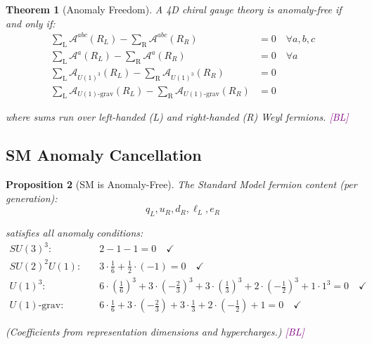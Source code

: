 \documentclass[11pt,a4paper]{article}
\newtheorem{theorem}{Theorem}[section]
\newtheorem{proposition}[theorem]{Proposition}
\newcommand{\tagBL}{\textcolor{purple}{[BL]}}
\begin{document}
\begin{theorem}[Anomaly Freedom]
\label{thm:anomaly-free}
A 4D chiral gauge theory is anomaly-free if and only if:
\begin{align}
\label{eq:anomaly-cond-1}
\sum_{\text{L}} \mathcal{A}^{abc}(R_L) - \sum_{\text{R}} \mathcal{A}^{abc}(R_R) &= 0 \quad \forall a, b, c \\
\label{eq:anomaly-cond-2}
\sum_{\text{L}} \mathcal{A}^a(R_L) - \sum_{\text{R}} \mathcal{A}^a(R_R) &= 0 \quad \forall a \\
\label{eq:anomaly-cond-3}
\sum_{\text{L}} \mathcal{A}_{U(1)^3}(R_L) - \sum_{\text{R}} \mathcal{A}_{U(1)^3}(R_R) &= 0 \\
\label{eq:anomaly-cond-4}
\sum_{\text{L}} \mathcal{A}_{U(1)\text{-grav}}(R_L) - \sum_{\text{R}} \mathcal{A}_{U(1)\text{-grav}}(R_R) &= 0
\end{align}

where sums run over left-handed (L) and right-handed (R) Weyl fermions.
\tagBL
\end{theorem}

\subsection{SM Anomaly Cancellation}

\begin{proposition}[SM is Anomaly-Free]
\label{prop:sm-anomaly}
The Standard Model fermion content (per generation):
\begin{equation}
\label{eq:sm-content}
q_L, u_R, d_R, \ell_L, e_R
\end{equation}

satisfies all anomaly conditions:
\begin{align}
\label{eq:sm-su3-3}
SU(3)^3: \quad & 2 - 1 - 1 = 0 \quad \checkmark \\
\label{eq:sm-su2-2-u1}
SU(2)^2 U(1): \quad & 3 \cdot \frac{1}{6} + \frac{1}{2} \cdot (-1) = 0 \quad \checkmark \\
\label{eq:sm-u1-3}
U(1)^3: \quad & 6 \cdot (\frac{1}{6})^3 + 3 \cdot (-\frac{2}{3})^3 + 3 \cdot (\frac{1}{3})^3 + 2 \cdot (-\frac{1}{2})^3 + 1 \cdot 1^3 = 0 \quad \checkmark \\
\label{eq:sm-grav}
U(1)\text{-grav}: \quad & 6 \cdot \frac{1}{6} + 3 \cdot (-\frac{2}{3}) + 3 \cdot \frac{1}{3} + 2 \cdot (-\frac{1}{2}) + 1 = 0 \quad \checkmark
\end{align}

(Coefficients from representation dimensions and hypercharges.)
\tagBL
\end{proposition}
\end{document}
